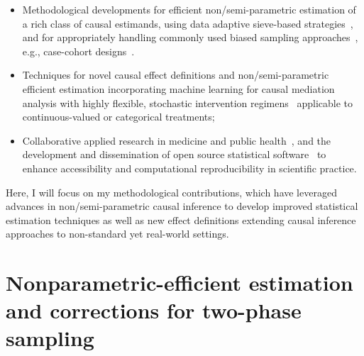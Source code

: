 \begin{itemize}
  \itemsep0.2pt
  \item Methodological developments for efficient non/semi-parametric estimation
     of a rich class of causal estimands, using data adaptive sieve-based
     strategies~\citep{ertefaie2020nonparametric},
    and for appropriately handling commonly used
    biased sampling approaches~\citep{hejazi2020efficient}, e.g., case-cohort
    designs~\citep{prentice1986case,breslow2009improved}.
  \item Techniques for novel causal effect definitions and
    non/semi-parametric efficient estimation incorporating machine learning for
    causal mediation analysis with highly flexible, stochastic intervention
    regimens~\citep{diaz2020causal, diaz2020nonparametric,
    hejazi2020nonparametric} applicable to continuous-valued or categorical
    treatments;
    \item Collaborative applied research in medicine and public
      health~\citep{benjamin-chung2020longitudinal,
      mertens2020longitudinal, mertens2020causes, rudolph2020explaining,
      gray2020vaccine}, and the development and dissemination of open
      source statistical software~\citep{hejazi2020txshift,
      hejazi2020hal9001, coyle2018origami, benkeser-cran-survtmle,
      coyle-gh-sl3, hejazi-gh-tmle3shift, hejazi-gh-medshift,
      hejazi-gh-medoutcon,
       hejazi-gh-haldensify} to enhance accessibility and
      computational reproducibility in scientific practice.
\end{itemize}
Here, I will focus on my methodological contributions, which have leveraged
advances in non/semi-parametric causal inference to develop improved statistical
estimation techniques as well as new effect definitions extending causal
inference approaches to non-standard yet real-world settings.

\section{Nonparametric-efficient estimation and corrections for two-phase
  sampling}

